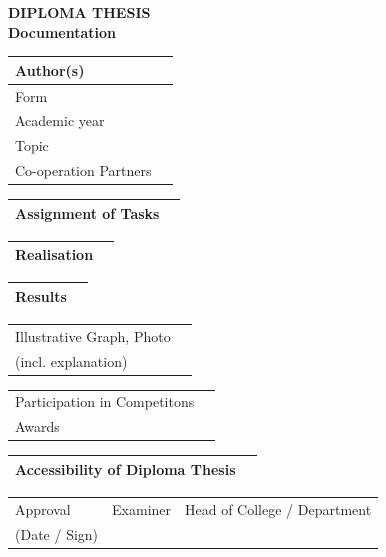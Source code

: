\begin{center}
 \LARGE \textbf{DIPLOMA THESIS}\\
 \Large \textbf{Documentation}\\
 \normalsize
\end{center}

\linespread{1.1} \normalsize
\begin{tabular}{|p{\feldC}|p{\feldD}|}
 \hline
 Author(s) & \\
 \hline
 Form & \\ Academic year & \\
 \hline
 Topic & \\
 \hline
 Co-operation Partners & \\
 \hline
\end{tabular}

\begin{tabular}{|p{\feldC}|p{\feldD}|}
 \hline
 Assignment of Tasks & \\
 \hline
\end{tabular}

\begin{tabular}{|p{\feldC}|p{\feldD}|}
 \hline
 Realisation & \\
 \hline
\end{tabular}

\begin{tabular}{|p{\feldC}|p{\feldD}|}
 \hline
 Results & \\
 \hline
\end{tabular}

\begin{tabular}{|p{\feldC}|p{\feldD}|}
 \hline
 Illustrative Graph, Photo & \\
 (incl. explanation) & \\
 \hline
\end{tabular}

\begin{tabular}{|p{\feldC}|p{\feldD}|}
 \hline
 Participation in Competitons & \\
 Awards & \\
 \hline
\end{tabular}

\begin{tabular}{|p{\feldC}|p{\feldD}|}
 \hline
 Accessibility of Diploma Thesis & \\
 \hline
\end{tabular}

\begin{tabular}{|p{\feldC}|p{\feldE}|p{\feldE}|}
 \hline
 Approval & \scriptsize{Examiner} & \scriptsize{Head of College / Department}\\ 
 (Date / Sign)& & \\
 \hline
\end{tabular}
\linespread{1.25} \normalsize
